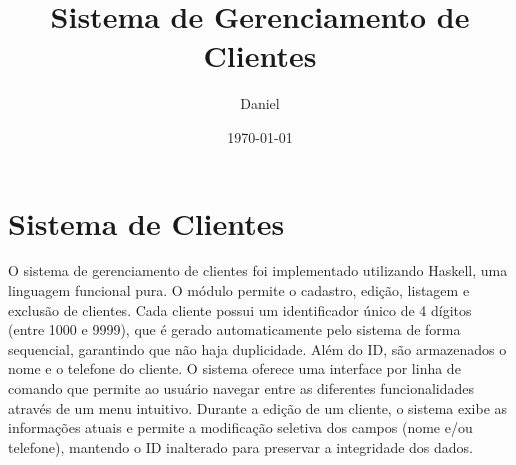 \documentclass[12pt,a4paper]{article}
\title{Sistema de Gerenciamento de Clientes}
\author{Daniel}
\date{\today}
\begin{document}
\maketitle

\section{Sistema de Clientes}

O sistema de gerenciamento de clientes foi implementado utilizando Haskell, uma linguagem 
funcional pura. O módulo permite o cadastro, edição, listagem e exclusão de clientes. 
Cada cliente possui um identificador único de 4 dígitos (entre 1000 e 9999), que é 
gerado automaticamente pelo sistema de forma sequencial, garantindo que não haja duplicidade. 
Além do ID, são armazenados o nome e o telefone do cliente. O sistema oferece uma interface 
por linha de comando que permite ao usuário navegar entre as diferentes funcionalidades 
através de um menu intuitivo. Durante a edição de um cliente, o sistema exibe as 
informações atuais e permite a modificação seletiva dos campos (nome e/ou telefone), 
mantendo o ID inalterado para preservar a integridade dos dados.
\end{document}

